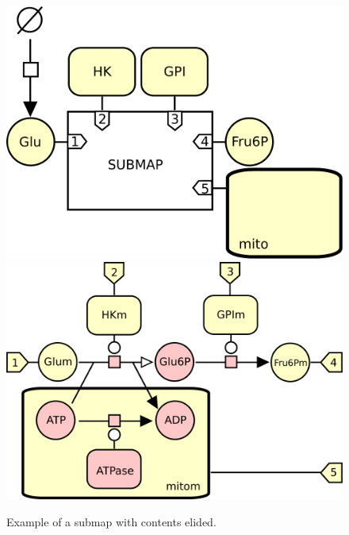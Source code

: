 \begin{figure}[H]
  \centering
  \includegraphics[scale = 0.4]{le_images/submap-folded}
  \includegraphics[scale = 0.35]{le_images/submap-unfolded}
  \caption{Example of a submap with contents elided.}
  \label{fig:submap-folded}
\end{figure}


%
%
% 
%
%
%
